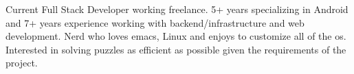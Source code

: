

\begin{cvparagraph}

Current Full Stack Developer working freelance. 5+ years specializing in Android and 7+ years experience working with backend/infrastructure and web development. Nerd who loves emacs, Linux and enjoys to customize all of the os. Interested in solving puzzles as efficient as possible given the requirements of the project.
\end{cvparagraph}
